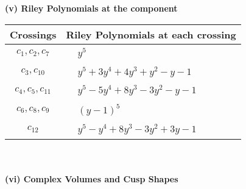 \documentclass[1p]{elsarticle_modified}
\theoremstyle{definition}
\begin{document}
\newpage\renewcommand{\arraystretch}{1}
\flushleft \textbf{(v) Riley Polynomials at the component}\newline \\
\begin{tabular}{m{50pt}|m{274pt}}
Crossings & \hspace{64pt}Riley Polynomials at each crossing \\
\hline $$\begin{aligned}c_{1},c_{2},c_{7}\end{aligned}$$&$\begin{aligned}
&y^5
\end{aligned}$\\
\hline $$\begin{aligned}c_{3},c_{10}\end{aligned}$$&$\begin{aligned}
&y^5+3 y^4+4 y^3+y^2- y-1
\end{aligned}$\\
\hline $$\begin{aligned}c_{4},c_{5},c_{11}\end{aligned}$$&$\begin{aligned}
&y^5-5 y^4+8 y^3-3 y^2- y-1
\end{aligned}$\\
\hline $$\begin{aligned}c_{6},c_{8},c_{9}\end{aligned}$$&$\begin{aligned}
&(y-1)^5
\end{aligned}$\\
\hline $$\begin{aligned}c_{12}\end{aligned}$$&$\begin{aligned}
&y^5- y^4+8 y^3-3 y^2+3 y-1
\end{aligned}$\\
\hline
\end{tabular}\\~\\
\newpage\flushleft \textbf{(vi) Complex Volumes and Cusp Shapes}
\end{document}
